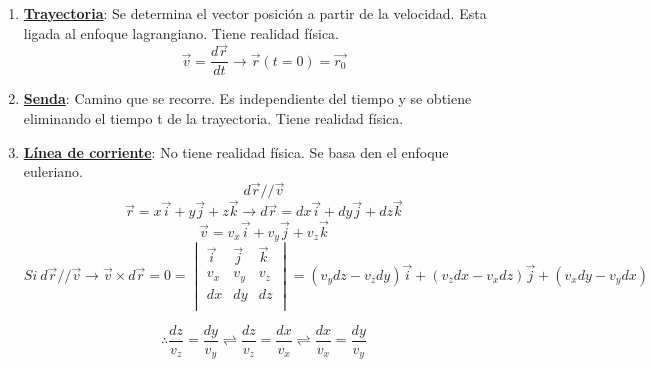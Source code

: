\begin{enumerate}
	\item \underline{\textbf{Trayectoria}}: Se determina el vector posición a partir de la velocidad. Esta ligada al enfoque lagrangiano. Tiene realidad física.
	\[\vec{v}=\frac{d\vec{r}}{dt} \rightarrow \vec{r}(t=0)=\vec{r_0}\]
	
	\item \underline{\textbf{Senda}}: Camino que se recorre. Es independiente del tiempo y se obtiene eliminando el tiempo t de la trayectoria. Tiene realidad física.
	
	\item \underline{\textbf{Línea de corriente}}: No tiene realidad física. Se basa den el enfoque euleriano.
	\[d\vec{r}//\vec{v}\]
	\[\vec{r}=x\vec{i}+y\vec{j}+z\vec k \rightarrow d\vec{r}=dx\vec{i}+dy\vec{j}+dz\vec{k}\]
	\[\vec{v}=v_x\vec{i}+v_y\vec{j}+v_z\vec{k}\]
	\[Si \ d\vec{r} // \vec{v} \rightarrow \vec{v} \times d\vec{r}=0= \begin{vmatrix}
		\vec i & \vec j & \vec k \\
		v_x & v_y & v_z \\
		dx & dy & dz \\
	\end{vmatrix}= \left(v_ydz-v_zdy\right)\vec{i} +\left(v_zdx-v_xdz\right)\vec{j}+\left(v_xdy-v_ydx\right) \]
	
	\[\therefore\frac{dz}{v_z}=\frac{dy}{v_y} \rightleftharpoons \frac{dz}{v_z}=\frac{dx}{v_x} \rightleftharpoons \frac{dx}{v_x}=\frac{dy}{v_y} \]
\end{enumerate}

